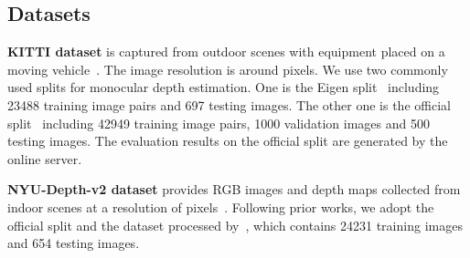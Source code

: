 \documentclass[letterpaper]{article} \usepackage{aaai23}  \usepackage{times}  \usepackage{helvet}  \usepackage{courier}  \usepackage[hyphens]{url}  \usepackage{graphicx} \urlstyle{rm} \def\UrlFont{\rm}  \usepackage{natbib}  \usepackage{caption} \frenchspacing  \setlength{\pdfpagewidth}{8.5in} \setlength{\pdfpageheight}{11in} \usepackage{algorithm}
\begin{document}
\subsection{Datasets}
\textbf{KITTI dataset} is captured from outdoor scenes with equipment placed on a moving vehicle~\cite{geiger2013vision}. The image resolution is around  pixels. We use two commonly used splits for monocular depth estimation. One is the Eigen split~\cite{eigen2014depth} including 23488 training image pairs and 697 testing images. The other one is the official split~\cite{geiger2013vision} including 42949 training image pairs, 1000 validation images and 500 testing images. The evaluation results on the official split are generated by the online server.

\textbf{NYU-Depth-v2 dataset} provides RGB images and depth maps collected from indoor scenes at a resolution of  pixels~\cite{silberman2012indoor}. Following prior works, we adopt the official split and the dataset processed by~\citet{lee2019big}, which contains 24231 training images and 654 testing images.
\end{document}
